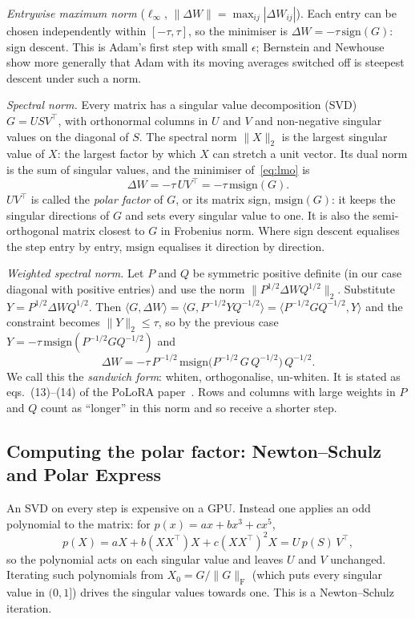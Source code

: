\documentclass[11pt]{article}
\newcommand{\fro}{\mathrm{F}}
\newcommand{\msign}{\mathrm{msign}}
\begin{document}
\emph{Entrywise maximum norm} ($\ell_\infty$, $\|\Delta W\|=\max_{ij}|\Delta W_{ij}|$). Each entry
can be chosen independently within $[-\tau,\tau]$, so the minimiser is $\Delta W=-\tau\,
\mathrm{sign}(G)$: sign descent. This is Adam's first step with small $\epsilon$; Bernstein and
Newhouse~\cite{bernstein2024} show more generally that Adam with its moving averages switched off is
steepest descent under such a norm.

\emph{Spectral norm.} Every matrix has a singular value decomposition (SVD) $G=USV^\top$, with
orthonormal columns in $U$ and $V$ and non-negative singular values on the diagonal of $S$. The
spectral norm $\|X\|_2$ is the largest singular value of $X$: the largest factor by which $X$ can
stretch a unit vector. Its dual norm is the sum of singular values, and the minimiser
of~\eqref{eq:lmo} is
\[
\Delta W=-\tau\,UV^\top=-\tau\,\msign(G).
\]
$UV^\top$ is called the \emph{polar factor} of $G$, or its matrix sign, $\msign(G)$: it keeps the
singular directions of $G$ and sets every singular value to one. It is also the semi-orthogonal
matrix closest to $G$ in Frobenius norm. Where sign descent equalises the step entry by entry,
$\msign$ equalises it direction by direction.

\emph{Weighted spectral norm.} Let $P$ and $Q$ be symmetric positive definite (in our case diagonal
with positive entries) and use the norm $\|P^{1/2}\Delta W Q^{1/2}\|_2$. Substitute
$Y=P^{1/2}\Delta W Q^{1/2}$. Then $\langle G,\Delta W\rangle=\langle G,P^{-1/2}YQ^{-1/2}\rangle=
\langle P^{-1/2}GQ^{-1/2},Y\rangle$ and the constraint becomes $\|Y\|_2\le\tau$, so by the previous
case $Y=-\tau\,\msign(P^{-1/2}GQ^{-1/2})$ and
\begin{equation}\label{eq:sandwich}
\Delta W=-\tau\,P^{-1/2}\,\msign\!\big(P^{-1/2}\,G\,Q^{-1/2}\big)\,Q^{-1/2}.
\end{equation}
We call this the \emph{sandwich form}: whiten, orthogonalise, un-whiten. It is stated as eqs.~(13)--(14)
of the PoLoRA paper~\cite{polora}. Rows and columns with large weights in $P$ and $Q$ count as
``longer'' in this norm and so receive a shorter step.

\subsection{Computing the polar factor: Newton--Schulz and Polar Express}
An SVD on every step is expensive on a GPU. Instead one applies an odd polynomial to the matrix:
for $p(x)=ax+bx^3+cx^5$,
\[
p(X)=aX+b(XX^\top)X+c(XX^\top)^2X=U\,p(S)\,V^\top ,
\]
so the polynomial acts on each singular value and leaves $U$ and $V$ unchanged. Iterating such
polynomials from $X_0=G/\|G\|_\fro$ (which puts every singular value in $(0,1]$) drives the
singular values towards one. This is a Newton--Schulz iteration.
\end{document}
